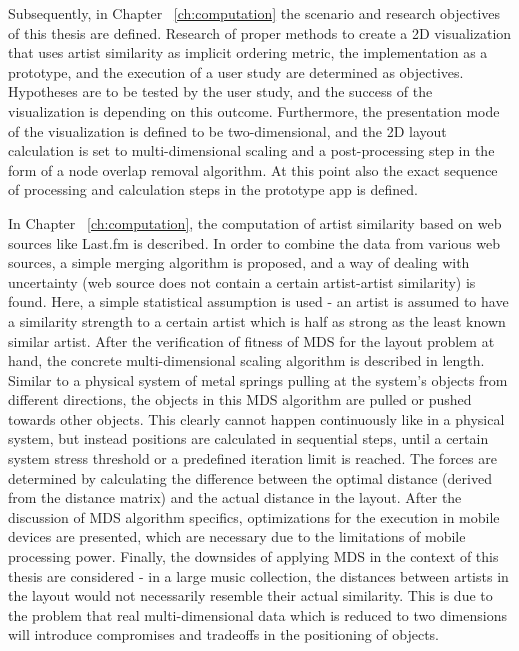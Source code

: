 Subsequently, in Chapter ~\ref{ch:computation} the scenario and research objectives of this thesis are defined. Research of proper methods to create a 2D visualization that uses artist similarity as implicit ordering metric, the implementation as a prototype, and the execution of a user study are determined as objectives. Hypotheses are to be tested by the user study, and the success of the visualization is depending on this outcome. Furthermore, the presentation mode of the visualization is defined to be two-dimensional, and the 2D layout calculation is set to multi-dimensional scaling and a post-processing step in the form of a node overlap removal algorithm. At this point also the exact sequence of processing and calculation steps in the prototype app is defined.

In Chapter ~\ref{ch:computation}, the computation of artist similarity based on web sources like Last.fm is described. In order to combine the data from various web sources, a simple merging algorithm is proposed, and a way of dealing with uncertainty (web source does not contain a certain artist-artist similarity) is found. Here, a simple statistical assumption is used - an artist is assumed to have a similarity strength to a certain artist which is half as strong as the least known similar artist. After the verification of fitness of MDS for the layout problem at hand, the concrete multi-dimensional scaling algorithm is described in length. Similar to a physical system of metal springs pulling at the system's objects from different directions, the objects in this MDS algorithm are pulled or pushed towards other objects. This clearly cannot happen continuously like in a physical system, but instead positions are calculated in sequential steps, until a certain system stress threshold or a predefined iteration limit is reached. The forces are determined by calculating the difference between the optimal distance (derived from the distance matrix) and the actual distance in the layout. After the discussion of MDS algorithm specifics, optimizations for the execution in mobile devices are presented, which are necessary due to the limitations of mobile processing power. Finally, the downsides of applying MDS in the context of this thesis are considered - in a large music collection, the distances between artists in the layout would not necessarily resemble their actual similarity. This is due to the problem that real multi-dimensional data which is reduced to two dimensions will introduce compromises and tradeoffs in the positioning of objects.

